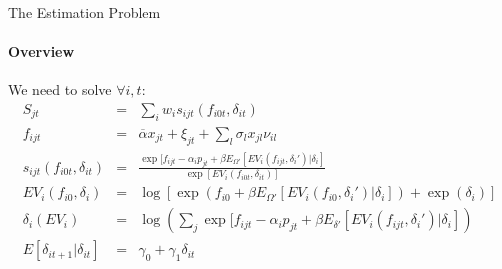 \documentclass[11pt,aspectratio=169]{beamer}
\begin{document}

\begin{frame}{The Estimation Problem}
\framesubtitle{Overview}
\small
We need to solve $\forall i, t $:
\begin{eqnarray*}
S_{jt} &=& \sum_i w_i s_{ijt}(f_{i0t},\delta_{it})\\
f_{ijt} &=& \overline{\alpha} x_{jt} + \xi_{jt} + \sum_l \sigma_l x_{jl} \nu_{il} \\
s_{ijt}(f_{i0t},\delta_{it}) &=& \frac{\exp[f_{ijt} - \alpha_i p_{jt} + \beta E_{\Omega'}[ EV_i (f_{ijt}, \delta_i') |\delta_i] }{\exp [EV_i(f_{i0t},\delta_{it}) ]}\\
EV_i(f_{i0}, \delta_i) &=& \log\left[ \exp( f_{i0} + \beta E_{\Omega'}[ EV_i (f_{i0}, \delta_i') |\delta_i] )+ \exp(\delta_i)  \right]\\
\delta_{i}(EV_i) &=& \log \left( \sum_j \exp[ f_{ijt}  -\alpha_i p_{jt} + \beta E_{\delta'}[ E V_i (f_{ijt}, \delta_i') |\delta_i ]  \right)\\
E[\delta_{it+1} | \delta_{it}] &=& \gamma_0 + \gamma_1 \delta_{it}\\
\end{eqnarray*}
\end{frame}
\end{document}
